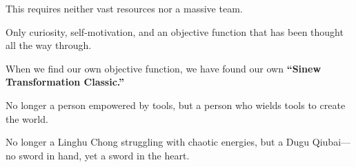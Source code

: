 This requires neither vast resources nor a massive team.

Only curiosity, self-motivation, and an objective function that has been thought all the way through.

\vspace{1em}

When we find our own objective function, we have found our own \textbf{``Sinew Transformation Classic.''}

No longer a person empowered by tools, but a person who wields tools to create the world.

No longer a Linghu Chong struggling with chaotic energies, but a Dugu Qiubai---no sword in hand, yet a sword in the heart.
